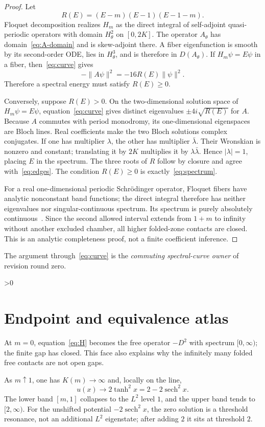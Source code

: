 \documentclass[10pt]{article}
\providecommand{\CRevisionRound}{2}
\newcommand{\HH}{H_m}
\begin{document}
\begin{proof}
Let
\[
 R(E)=(E-m)(E-1)(E-1-m).
\]
Floquet decomposition realizes $\HH$ as the direct integral of self-adjoint
quasi-periodic operators with domain $H^2_\theta$ on $[0,2K]$.  The operator
$A_\theta$ has domain~\eqref{eq:A-domain} and is skew-adjoint there.  A fiber
eigenfunction is smooth by its second-order ODE, lies in $H^3_\theta$, and
is therefore in $D(A_\theta)$.  If $\HH\psi=E\psi$ in a fiber,
then~\eqref{eq:curve} gives
\[
 -\|A\psi\|^2=-16R(E)\|\psi\|^2.
\]
Therefore a spectral energy must satisfy $R(E)\ge0$.

Conversely, suppose $R(E)>0$.  On the two-dimensional solution space of
$\HH\psi=E\psi$, equation~\eqref{eq:curve} gives distinct eigenvalues
$\pm4i\sqrt{R(E)}$ for $A$.  Because $A$ commutes with period monodromy,
its one-dimensional eigenspaces are Bloch lines.  Real coefficients make the
two Bloch solutions complex conjugates.  If one has multiplier $\lambda$,
the other has multiplier $\bar\lambda$.  Their Wronskian is nonzero and
constant; translating it by $2K$ multiplies it by
$\lambda\bar\lambda$.  Hence $|\lambda|=1$, placing $E$ in the spectrum.
The three roots of $R$ follow by closure and agree with~\eqref{eq:edges}.
The condition $R(E)\ge0$ is exactly~\eqref{eq:spectrum}.

For a real one-dimensional periodic Schr\"odinger operator, Floquet fibers
have analytic nonconstant band functions; the direct integral therefore has
neither eigenvalues nor singular-continuous spectrum.  Its spectrum is purely
absolutely continuous~\cite{Kuchment}.  Since the second allowed interval extends from
$1+m$ to infinity without another excluded chamber, all higher folded-zone
contacts are closed.  This is an analytic completeness proof, not a finite
coefficient inference.
\end{proof}

The argument through~\eqref{eq:curve} is the \emph{commuting spectral-curve
owner} of revision round zero.

\ifnum\CRevisionRound>0
\section{Endpoint and equivalence atlas}

At $m=0$, equation~\eqref{eq:H} becomes the free operator $-D^2$ with
spectrum $[0,\infty)$; the finite gap has closed.  This face also explains
why the infinitely many folded free contacts are not open gaps.

As $m\uparrow1$, one has $K(m)\to\infty$ and, locally on the line,
\[
 u(x)\longrightarrow2\tanh^2x=2-2\operatorname{sech}^2x.
\]
The lower band $[m,1]$ collapses to the $L^2$ level $1$, and the upper band
tends to $[2,\infty)$.  For the unshifted potential
$-2\operatorname{sech}^2x$, the zero solution is a threshold resonance, not
an additional $L^2$ eigenstate; after adding $2$ it sits at threshold $2$.
\end{document}
